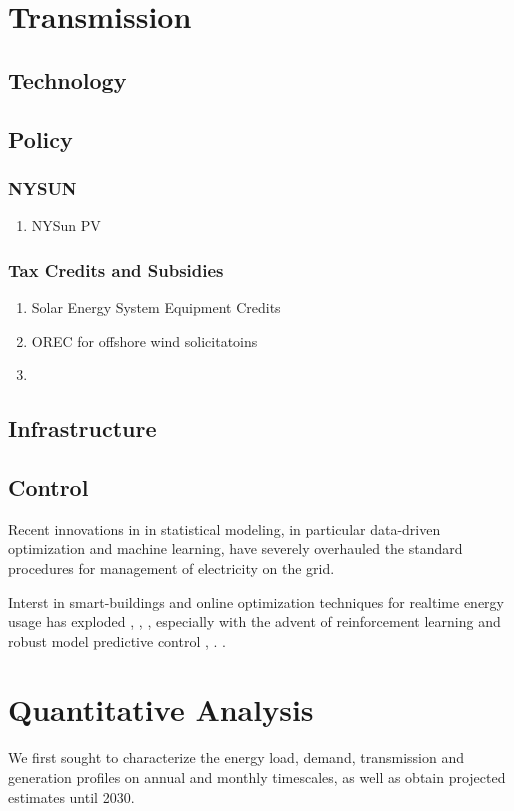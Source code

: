 \documentclass[plain]{article}
\newcommand{\1}{\mathbbm{1}}
\begin{document}
\section{Transmission}


\subsection{Technology}

\subsection{Policy}
\subsubsection{NYSUN}
\begin{enumerate}
	\item NYSun PV
\end{enumerate}
\subsubsection{Tax Credits and Subsidies}
\begin{enumerate}
	\item Solar Energy System Equipment Credits
	\item OREC for offshore wind solicitatoins
	\item 
\end{enumerate}

\subsection{Infrastructure}

\subsection{Control}
Recent innovations in in statistical modeling, in particular data-driven optimization and machine learning, have severely overhauled the standard procedures for management of electricity on the grid. 

Interst in smart-buildings and online optimization techniques for realtime energy usage has exploded \cite{yu_review_2021}, \cite{khan_modeling_2022}, \cite{sembroiz_planning_2019}, especially with the advent of reinforcement learning and robust model predictive control \cite{chen_efficient_2020}, \cite{yang_adaptive_2019}. . 
\section{Quantitative Analysis}
We first sought to characterize the energy load, demand, transmission and generation profiles on annual and monthly timescales, as well as obtain projected estimates until 2030. 
\end{document}
